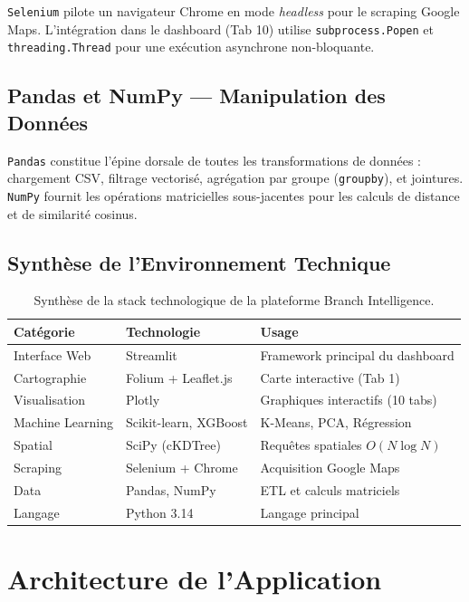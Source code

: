 \documentclass[11pt,a4paper,twoside]{report}
\begin{document}
\texttt{Selenium} pilote un navigateur Chrome en mode \textit{headless} pour le scraping Google Maps. L'intégration dans le dashboard (Tab 10) utilise \texttt{subprocess.Popen} et \texttt{threading.Thread} pour une exécution asynchrone non-bloquante.

\subsection{Pandas et NumPy — Manipulation des Données}

\texttt{Pandas} constitue l'épine dorsale de toutes les transformations de données : chargement CSV, filtrage vectorisé, agrégation par groupe (\texttt{groupby}), et jointures. \texttt{NumPy} fournit les opérations matricielles sous-jacentes pour les calculs de distance et de similarité cosinus.

\subsection{Synthèse de l'Environnement Technique}

\begin{table}[h]
\centering
\begin{tabular}{|l|l|l|}
\hline
\textbf{Catégorie} & \textbf{Technologie} & \textbf{Usage} \\ \hline
Interface Web & Streamlit & Framework principal du dashboard \\ \hline
Cartographie & Folium + Leaflet.js & Carte interactive (Tab 1) \\ \hline
Visualisation & Plotly & Graphiques interactifs (10 tabs) \\ \hline
Machine Learning & Scikit-learn, XGBoost & K-Means, PCA, Régression \\ \hline
Spatial & SciPy (cKDTree) & Requêtes spatiales $O(N \log N)$ \\ \hline
Scraping & Selenium + Chrome & Acquisition Google Maps \\ \hline
Data & Pandas, NumPy & ETL et calculs matriciels \\ \hline
Langage & Python 3.14 & Langage principal \\ \hline
\end{tabular}
\caption{Synthèse de la stack technologique de la plateforme Branch Intelligence.}
\label{tab:tech_stack}
\end{table}

\section{Architecture de l'Application}
\end{document}
